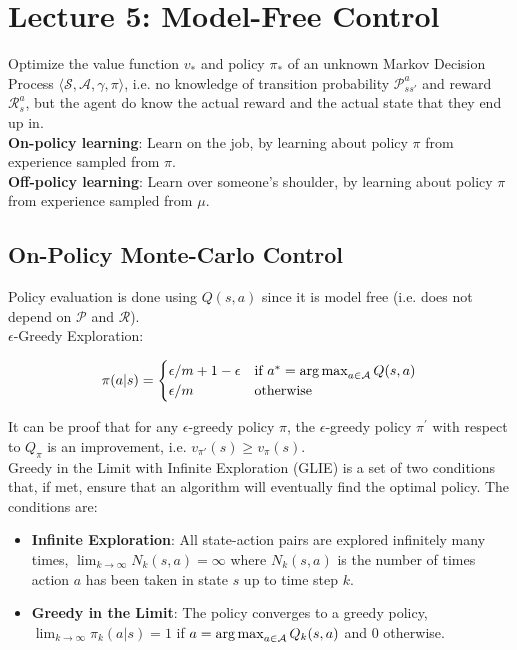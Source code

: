 \section{Lecture 5: Model-Free Control}

Optimize the value function $v_*$ and policy $\pi_*$ of an unknown Markov
Decision Process $\langle \mathcal{S}, \mathcal{A}, \gamma, \pi \rangle$, i.e.
no knowledge of transition probability $\mathcal{P}_{ss\prime}^a$ and reward
$\mathcal{R}_s^a$, but the agent do know the actual reward and the actual state
that they end up in.\\

\noindent \textbf{On-policy learning}: Learn on the job, by learning about policy $\pi$ from
experience sampled from $\pi$. \\

\noindent \textbf{Off-policy learning}: Learn over someone's shoulder, by learning about policy
$\pi$ from experience sampled from $\mu$.

\subsection{On-Policy Monte-Carlo Control}

Policy evaluation is done using $Q(s, a)$ since it is model free (i.e. does not
depend on $\mathcal{P}$ and $\mathcal{R}$). \\

\noindent $\epsilon$-Greedy Exploration:

\begin{equation*}
    \pi(a|s) = \begin{cases}
        \epsilon / m + 1 - \epsilon & \text{if } a^* = \operatorname*{arg\,max}_{a \in \mathcal{A}} Q(s, a) \\
        \epsilon / m                & \text{otherwise}
    \end{cases}
\end{equation*}

\noindent It can be proof that for any $\epsilon$-greedy policy $\pi$, the
$\epsilon$-greedy policy $\pi^\prime$ with respect to $Q_\pi$ is an
improvement, i.e. $v_{\pi\prime}(s) \ge v_\pi(s)$. \\

\noindent Greedy in the Limit with Infinite Exploration (GLIE) is a set of two conditions
that, if met, ensure that an algorithm will eventually find the optimal policy.
The conditions are:

\begin{itemize}
    \item \textbf{Infinite Exploration}: All state-action pairs are explored infinitely many times,
          $\lim_{k \to \infty} N_k(s, a) = \infty$ where $N_k(s, a)$ is the number of times action
          $a$ has been taken in state $s$ up to time step $k$.
    \item \textbf{Greedy in the Limit}: The policy converges to a greedy policy,
          $\lim_{k \to \infty} \pi_k(a|s) = 1$ if $a = \operatorname*{arg\,max}_{a \in \mathcal{A}} Q_k(s, a)$ and
          0 otherwise.
\end{itemize}

